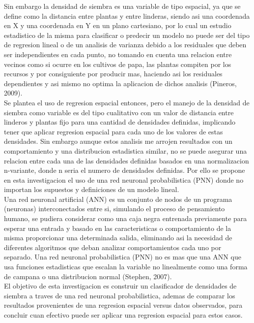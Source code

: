 Sin embargo la densidad de siembra es una variable de tipo espacial, ya que se define como la distancia entre plantas y entre linderas, siendo asi una coordenada en X y una coordenada en Y en un plano cartesiano, por lo cual un estudio estadistico de la misma para clasificar o predecir un modelo no puede ser del tipo de regresion lineal o de un analisis de varianza debido a los residuales que deben ser independientes en cada punto, no tomando en cuenta una relacion entre vecinos como si ocurre en los cultivos de papa, las plantas compiten por los recursos y por consiguiente por producir mas, haciendo asi los residuales dependientes y asi mismo no optima la aplicacion de dichos analisis (Pineros, 2009). \\

Se plantea el uso de regresion espacial entonces, pero el manejo de la densidad de siembra como variable es del tipo cualitativo con un valor de distancia entre linderos y plantas fijo para una cantidad de densidades definidas, implicando tener que aplicar regresion espacial para cada uno de los valores de estas densidades. Sin embargo aunque estos analisis me arrojen resultados con un comportamiento y una distribucion estadistica similar, no se puede asegurar una relacion entre cada una de las densidades definidas basados en una normalizacion n-variante, donde n seria el numero de densidades definidas. Por ello se propone en esta investigacion el uso de una red neuronal probabilistica (PNN) donde no importan los supuestos y definiciones de un modelo lineal.\\

Una red neuronal artificial (ANN) es un conjunto de nodos de un programa (neuronas) interconectados entre si, simulando el proceso de pensamiento humano, se pudiera considerar como una caja negra entrenada previamente para esperar una entrada y basado en las caracteristicas o comportamiento de la misma proporcionar una determinada salida, eliminando asi la necesidad de diferentes algoritmos que deban analizar comportamientos cada uno por separado. Una red neuronal probabilistica (PNN) no es mas que una ANN que usa funciones estadisticas que escalan la variable no linealmente como una forma de campana o una distribucion normal (Stephen, 2007).\\

El objetivo de esta investigacion es construir un clasificador de densidades de siembra a traves de una red neuronal probabilistica, ademas de comparar los resultados provenientes de una regresion espacial versus datos observados, para concluir cuan efectivo puede ser aplicar una regresion espacial para estos casos.\\